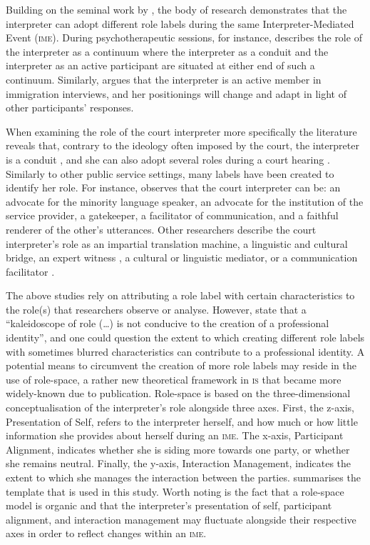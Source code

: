 \documentclass[output=paper]{langsci/langscibook}
\begin{document}
Building on the seminal work by \citet{Wadensjö1998}, the body of research demonstrates that the interpreter can adopt different role labels during the same Inter\-preter-Mediated Event (\textsc{ime}). During psychotherapeutic sessions, \citet{Bot2009} for instance, describes the role of the interpreter as a continuum where the interpreter as a conduit and the interpreter as an active participant are situated at either end of such a continuum. Similarly, \citet{Mason2009} argues that the interpreter is an active member in immigration interviews, and her positionings will change and adapt in light of other participants’ responses. 

When examining the role of the court interpreter more specifically the literature reveals that, contrary to the ideology often imposed by the court, the interpreter is a conduit \citep{Laster1994}, and she can also adopt several roles during a court hearing \citep{Berk-Seligson1990,Martin2009}. Similarly to other public service settings, many labels have been created to identify her role. For instance, \citet{Hale2008} observes that the court interpreter can be: an advocate for the minority language speaker, an advocate for the institution of the service provider, a gatekeeper, a facilitator of communication, and a faithful renderer of the other’s utterances. Other researchers describe the court interpreter’s role as an impartial translation machine, a linguistic and cultural bridge, an expert witness \citep{Mikkelson1998}, a cultural or linguistic mediator, or a communication facilitator \citep{Nartowska2016}.

The above studies rely on attributing a role label with certain characteristics to the role(s) that researchers observe or analyse. However, \citet[32]{Gentile1996} state that a “kaleidoscope of role (…) is not conducive to the creation of a professional identity”, and one could question the extent to which creating different role labels with sometimes blurred characteristics can contribute to a professional identity. A potential means to circumvent the creation of more role labels may reside in the use of role-space, a rather new theoretical framework in \textsc{is} that became more widely-known due to  publication. Role-space is based on the three-dimensional conceptualisation of the interpreter’s role alongside three axes. First, the z-axis, Presentation of Self, refers to the interpreter herself, and how much or how little information she provides about herself during an \textsc{ime}. The x-axis, Participant Alignment, indicates whether she is siding more towards one party, or whether she remains neutral. Finally, the y-axis, Interaction Management, indicates the extent to which she manages the interaction between the parties.  summarises the template that is used in this study. Worth noting is the fact that a role-space model is organic and that the interpreter’s presentation of self, participant alignment, and interaction management may fluctuate alongside their respective axes in order to reflect changes within an \textsc{ime}.
\end{document}
